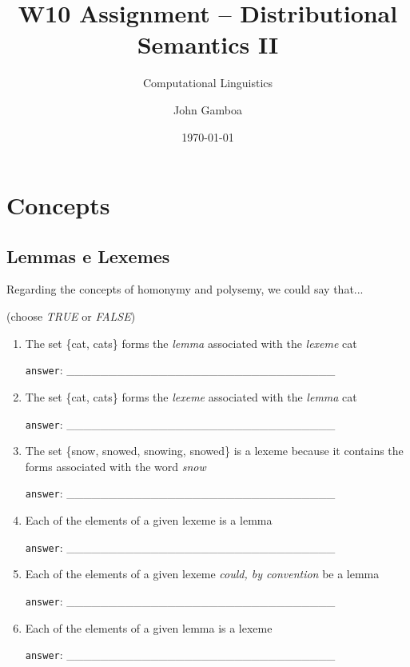 \documentclass[a4paper,11pt]{scrartcl}
\title{W10 Assignment -- Distributional Semantics II}
\subtitle{Computational Linguistics}
\author{John Gamboa}
\date{\today}
\begin{document}
\maketitle


\section{Concepts}

\subsection{Lemmas e Lexemes}

Regarding the concepts of homonymy and polysemy, we could say that...

(choose \textit{TRUE} or \textit{FALSE})

\begin{enumerate}[label=\alph*)]
\singlespacing%

\item The set \{cat, cats\} forms the \textit{lemma} associated with the
      \textit{lexeme} cat

\verb|answer|: \_\_\_\_\_\_\_\_\_\_\_\_\_\_\_\_\_\_\_\_\_\_\_\_\_\_\_\_\_\_\_\_

\item The set \{cat, cats\} forms the \textit{lexeme} associated with the
      \textit{lemma} cat

\verb|answer|: \_\_\_\_\_\_\_\_\_\_\_\_\_\_\_\_\_\_\_\_\_\_\_\_\_\_\_\_\_\_\_\_

\item The set \{snow, snowed, snowing, snowed\} is a lexeme because it contains
      the forms associated with the word \textit{snow}

\verb|answer|: \_\_\_\_\_\_\_\_\_\_\_\_\_\_\_\_\_\_\_\_\_\_\_\_\_\_\_\_\_\_\_\_

\item Each of the elements of a given lexeme is a lemma

\verb|answer|: \_\_\_\_\_\_\_\_\_\_\_\_\_\_\_\_\_\_\_\_\_\_\_\_\_\_\_\_\_\_\_\_

\item Each of the elements of a given lexeme \textit{could, by convention} be a lemma

\verb|answer|: \_\_\_\_\_\_\_\_\_\_\_\_\_\_\_\_\_\_\_\_\_\_\_\_\_\_\_\_\_\_\_\_

\item Each of the elements of a given lemma is a lexeme

\verb|answer|: \_\_\_\_\_\_\_\_\_\_\_\_\_\_\_\_\_\_\_\_\_\_\_\_\_\_\_\_\_\_\_\_

\end{enumerate}
\end{document}
